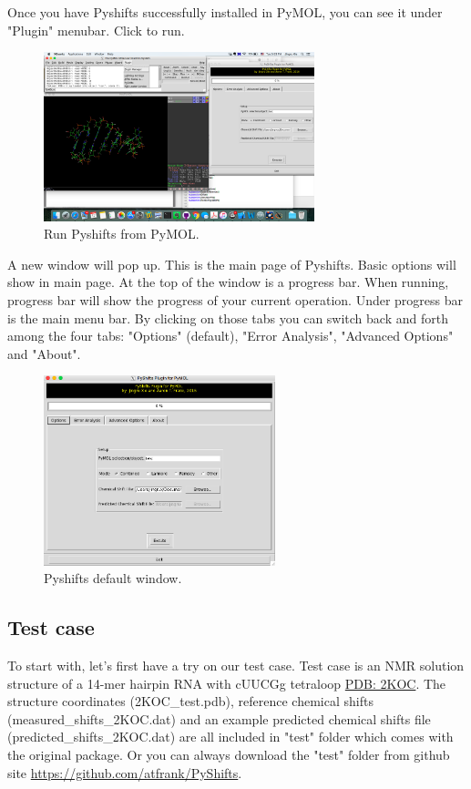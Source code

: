 \documentclass{article}
\begin{document}
Once you have Pyshifts successfully installed in PyMOL, you can see it under "Plugin" menubar. Click to run.

\begin{figure}[htbp]
\centering
\includegraphics[width=0.7\textwidth]{layout_0.png}
\caption{Run Pyshifts from PyMOL.}
\label{fig:layout0}
\end{figure}


A new window will pop up. This is the main page of Pyshifts. Basic options will show in main page. At the top of the window is a progress bar. When running, progress bar will show the progress of your current operation. Under progress bar is the main menu bar. By clicking on those tabs you can switch back and forth among the four tabs: "Options" (default), "Error Analysis", "Advanced Options" and "About".

\begin{figure}[htbp]
\centering
\includegraphics[width=0.6\textwidth]{main}
\caption{Pyshifts default window.}
\label{fig:layout1}
\end{figure}

\subsection{Test case}
To start with, let's first have a try on our test case. Test case is an NMR solution structure of a 14-mer hairpin RNA with cUUCGg tetraloop \href{http://www.rcsb.org/pdb/explore.do?structureId=2koc}{PDB: 2KOC}. The structure coordinates (2KOC\_test.pdb), reference chemical shifts (measured\_shifts\_2KOC.dat) and an example predicted chemical shifts file (predicted\_shifts\_2KOC.dat) are all included in "test" folder which comes with the original package. Or you can always download the "test" folder from github site \url{https://github.com/atfrank/PyShifts}.
\end{document}
